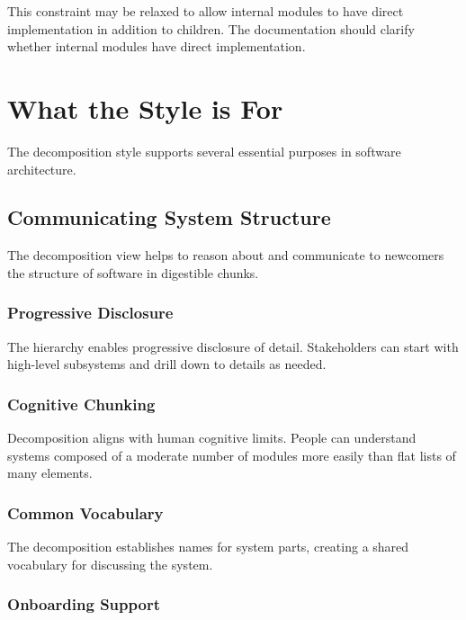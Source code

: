 \documentclass[11pt]{article}
\begin{document}
This constraint may be relaxed to allow internal modules to have direct implementation in addition to children. The documentation should clarify whether internal modules have direct implementation.

\section{What the Style is For}

The decomposition style supports several essential purposes in software architecture.

\subsection{Communicating System Structure}

The decomposition view helps to reason about and communicate to newcomers the structure of software in digestible chunks.

\subsubsection{Progressive Disclosure}

The hierarchy enables progressive disclosure of detail. Stakeholders can start with high-level subsystems and drill down to details as needed.

\subsubsection{Cognitive Chunking}

Decomposition aligns with human cognitive limits. People can understand systems composed of a moderate number of modules more easily than flat lists of many elements.

\subsubsection{Common Vocabulary}

The decomposition establishes names for system parts, creating a shared vocabulary for discussing the system.

\subsubsection{Onboarding Support}
\end{document}
